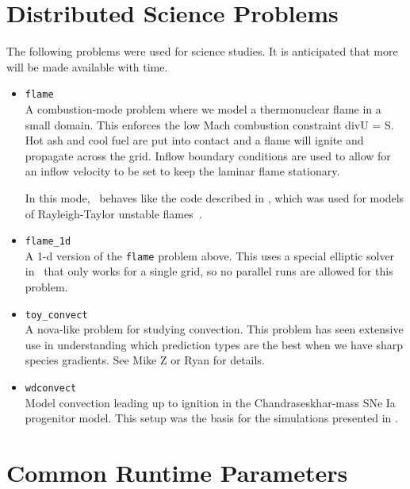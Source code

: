 \section{Distributed Science Problems}

The following problems were used for science studies.  It is
anticipated that more will be made available with time.

\begin{itemize}

\item {\tt flame} \\[-3mm]

   A combustion-mode problem where we model a thermonuclear flame in a
   small domain.  This enforces the low Mach combustion constraint
   div{U} = S.  Hot ash and cool fuel are put into contact and a flame
   will ignite and propagate across the grid.  Inflow boundary
   conditions are used to allow for an inflow velocity to be set to
   keep the laminar flame stationary.

   In this mode, \maestroex\ behaves like the code described
   in \cite{SNe}, which was used for models of Rayleigh-Taylor
   unstable flames~\cite{SNld,SNrt,SNrt3d}.

\item {\tt flame\_1d} \\[-3mm]

   A 1-d version of the {\tt flame} problem above.  This uses a special
   elliptic solver in \amrex\ that only works for a single grid, so
   no parallel runs are allowed for this problem.
   
\item {\tt toy\_convect} \\[-3mm]

A nova-like problem for studying convection.  This problem has seen
extensive use in understanding which prediction types are the best
when we have sharp species gradients.  See Mike Z or Ryan for details.

\item {\tt wdconvect} \\[-3mm]

Model convection leading up to ignition in the Chandraseskhar-mass SNe
Ia progenitor model.  This setup was the basis for the simulations
presented in \cite{lowMach4,wdconvect,wdturb}.


\end{itemize}


\section{Common Runtime Parameters}
\label{sec:gettingstarted:runtime}

